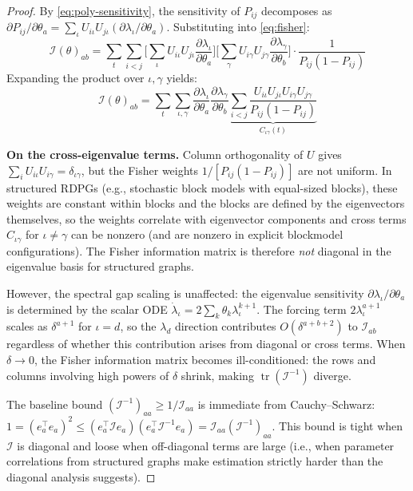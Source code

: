 \documentclass{article}
\DeclareMathOperator{\tr}{tr}
\theoremstyle{plain}
\theoremstyle{definition}
\theoremstyle{remark}
\begin{document}
\begin{proof}
By \cref{eq:poly-sensitivity}, the sensitivity of $P_{ij}$ decomposes as $\partial P_{ij} / \partial \theta_a = \sum_\iota U_{i\iota} U_{j\iota} (\partial \lambda_\iota / \partial \theta_a)$.
Substituting into \cref{eq:fisher}:
\begin{equation}
\mathcal{I}(\theta)_{ab} = \sum_t \sum_{i < j} \biggl[\sum_\iota U_{i\iota} U_{j\iota} \frac{\partial \lambda_\iota}{\partial \theta_a}\biggr] \biggl[\sum_\gamma U_{i\gamma} U_{j\gamma} \frac{\partial \lambda_\gamma}{\partial \theta_b}\biggr] \cdot \frac{1}{P_{ij}(1 - P_{ij})}
\end{equation}
Expanding the product over $\iota, \gamma$ yields:
\begin{equation}
\mathcal{I}(\theta)_{ab} = \sum_t \sum_{\iota, \gamma} \frac{\partial \lambda_\iota}{\partial \theta_a} \frac{\partial \lambda_\gamma}{\partial \theta_b} \underbrace{\sum_{i<j} \frac{U_{i\iota} U_{j\iota} U_{i\gamma} U_{j\gamma}}{P_{ij}(1 - P_{ij})}}_{C_{\iota\gamma}(t)}
\end{equation}

\textbf{On the cross-eigenvalue terms.}
Column orthogonality of $U$ gives $\sum_i U_{i\iota} U_{i\gamma} = \delta_{\iota\gamma}$, but the Fisher weights $1/[P_{ij}(1-P_{ij})]$ are not uniform.
In structured RDPGs (e.g., stochastic block models with equal-sized blocks), these weights are constant within blocks and the blocks are defined by the eigenvectors themselves, so the weights correlate with eigenvector components and cross terms $C_{\iota\gamma}$ for $\iota \neq \gamma$ can be nonzero (and are nonzero in explicit blockmodel configurations).
The Fisher information matrix is therefore \emph{not} diagonal in the eigenvalue basis for structured graphs.

However, the spectral gap scaling is unaffected: the eigenvalue sensitivity $\partial \lambda_\iota / \partial \theta_a$ is determined by the scalar ODE $\dot{\lambda}_\iota = 2 \sum_k \theta_k \lambda_\iota^{k+1}$.
The forcing term $2 \lambda_\iota^{a+1}$ scales as $\delta^{a+1}$ for $\iota = d$, so the $\lambda_d$ direction contributes $O(\delta^{a+b+2})$ to $\mathcal{I}_{ab}$ regardless of whether this contribution arises from diagonal or cross terms.
When $\delta \to 0$, the Fisher information matrix becomes ill-conditioned: the rows and columns involving high powers of $\delta$ shrink, making $\tr(\mathcal{I}^{-1})$ diverge.

The baseline bound $(\mathcal{I}^{-1})_{aa} \ge 1/\mathcal{I}_{aa}$ is immediate from Cauchy--Schwarz: $1 = (e_a^\top e_a)^2 \le (e_a^\top \mathcal{I} e_a)(e_a^\top \mathcal{I}^{-1} e_a) = \mathcal{I}_{aa} (\mathcal{I}^{-1})_{aa}$.
This bound is tight when $\mathcal{I}$ is diagonal and loose when off-diagonal terms are large (i.e., when parameter correlations from structured graphs make estimation strictly harder than the diagonal analysis suggests).
\end{proof}
\end{document}
